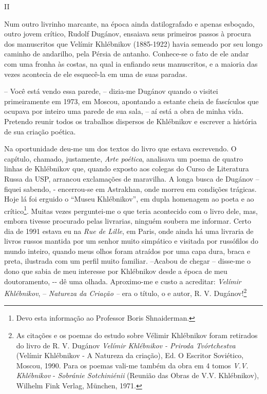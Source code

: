 II

Num outro livrinho marcante, na época ainda datilografado e apenas
esboçado, outro jovem crítico, Rudolf Dugánov, ensaiava seus primeiros
passos à procura dos manuscritos que Velímir Khlébnikov (1885-1922)
havia semeado por seu longo caminho de andarilho, pela Pérsia de
antanho. Conhece-se o fato de ele andar com uma fronha às costas, na
qual ia enfiando seus manuscritos, e a maioria das vezes acontecia de
ele esquecê-la em uma de suas paradas.

-- Você está vendo essa parede, -- dizia-me Dugánov quando o visitei
primeiramente em 1973, em Moscou, apontando a estante cheia de
fascículos que ocupava por inteiro uma parede de sua sala, -- aí está a
obra de minha vida. Pretendo reunir todos os trabalhos dispersos de
Khlébnikov e escrever a história de sua criação poética.

Na oportunidade deu-me um dos textos do livro que estava escrevendo. O
capítulo, chamado, justamente, \emph{Arte poética}, analisava um poema
de quatro linhas de Khlébnikov que, quando exposto aos colegas do Curso
de Literatura Russa da USP, arrancou exclamações de maravilha. A longa
busca de Dugánov -- fiquei sabendo, - encerrou-se em Astrakhan, onde
morreu em condições trágicas. Hoje lá foi erguido o ``Museu
Khlébnikov'', em dupla homenagem ao poeta e ao crítico\footnote{Devo
  esta informação ao Professor Boris Shnaiderman.}. Muitas vezes
perguntei-me o que teria acontecido com o livro dele, mas, embora
tivesse procurado pelas livrarias, ninguém soubera me informar. Certo
dia de 1991 estava eu na \emph{Rue de Lille}, em Paris, onde ainda há
uma livraria de livros russos mantida por um senhor muito simpático e
visitada por russófilos do mundo inteiro, quando meus olhos foram
atraídos por uma capa dura, braca e preta, ilustrada com um perfil muito
familiar. --Acabou de chegar -- disse-me o dono que sabia de meu
interesse por Khlébnikov desde a época de meu doutoramento, -\/- dê uma
olhada. Aproximo-me e custo a acreditar: \emph{Velímir Khlébnikov}, --
\emph{Natureza da Criação --} era o título, o e autor, R. V.
Dugánov!\footnote{As citações e os poemas do estudo sobre Vélimir
  Khlébnikov foram retirados do livro de R. V. Dugánov \emph{Velímir
  Khlébnikov - Priroda Tvórtchestva} (Velímir Khlébnikov - A Natureza da
  criação), Ed. O Escritor Soviético, Moscou, 1990. Para os poemas
  vali-me também da obra em 4 tomos \emph{V.V. Khlébnikov} -
  \emph{Sobránie Sotchiniénii} (Reunião das Obras de V.V. Khlébnikov),
  Wilhelm Fink Verlag, München, 1971.}

